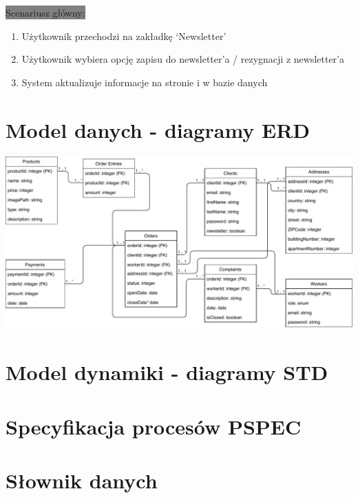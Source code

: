 \documentclass[12pt]{report}
\begin{document}
	\colorbox{grey}{Scenariusz główny:}
	\begin{enumerate}
		\item Użytkownik przechodzi na zakładkę ‘Newsletter’
		\item Użytkownik wybiera opcję zapisu do newsletter’a / rezygnacji z newsletter’a
		\item System aktualizuje informacje na stronie i w bazie danych
	\end{enumerate}

	\newpage
	

	\renewcommand{\thesection}{\thechapter.\arabic{section}}		
	
	\chapter{Model danych - diagramy ERD}

	\includegraphics[width=500pt]{database.pdf}
	
	
	\chapter{Model dynamiki - diagramy STD}
	
	\chapter{Specyfikacja procesów PSPEC}
	
	
	\chapter{Słownik danych}
	
\end{document}
